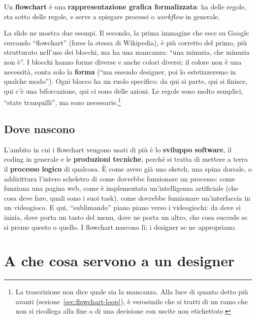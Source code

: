 Un \textbf{flowchart} è una \textbf{rappresentazione grafica formalizzata}:
ha delle regole, sta sotto delle regole, e serve a spiegare processi o
\emph{workflow} in generale.

La slide ne mostra due esempi. Il secondo, la prima immagine che esce su
Google cercando ``flowchart'' (forse la stessa di Wikipedia), è più corretto
del primo, più strutturato nell'uso dei blocchi, ma ha una mancanza: ``una
minuzia, che minuzia non è''. I blocchi hanno forme diverse e anche colori
diversi; il colore non è una necessità, conta solo la \textbf{forma} (``ma
essendo designer, poi lo estetizzeremo in qualche modo''). Ogni blocco ha un
ruolo specifico: da qui si parte, qui si finisce, qui c'è una biforcazione,
qui ci sono delle azioni. Le regole sono molto semplici, ``state
tranquilli'', ma sono necessarie.\footnote{La trascrizione non dice quale sia
la mancanza. Alla luce di quanto detto più avanti
(sezione~\ref{sec:flowchart-loop}), è verosimile che si tratti di un ramo
che non si ricollega alla fine o di una decisione con uscite non etichettate.}

\subsection{Dove nascono}

L'ambito in cui i flowchart vengono usati di più è lo \textbf{sviluppo
software}, il coding in generale e le \textbf{produzioni tecniche}, perché si
tratta di mettere a terra il \textbf{processo logico} di qualcosa. È come
avere già uno sketch, una spina dorsale, o addirittura l'intero scheletro di
come dovrebbe funzionare un processo: come funziona una pagina web, come è
implementata un'intelligenza artificiale (che cosa deve fare, quali sono i
suoi task), come dovrebbe funzionare un'interfaccia in un videogioco. E qui,
``sublimando'' piano piano verso i videogiochi: da dove si inizia, dove porta
un tasto del menu, dove ne porta un altro, che cosa succede se si preme
questo o quello. I flowchart nascono lì; i designer se ne appropriano.

\section{A che cosa servono a un designer}
\label{sec:flowchart-usi}



